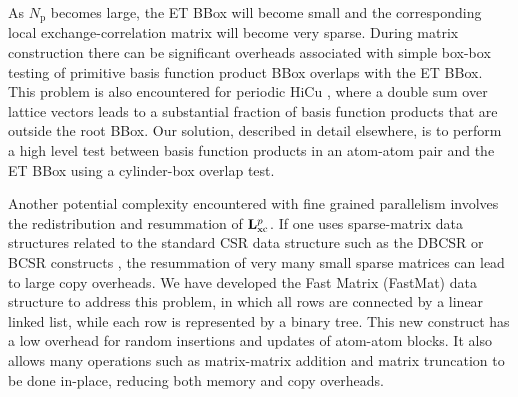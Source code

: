 \commentoutA{\documentclass[prl,aps,twocolumn,showpacs,twocolumngrid,superbib]{revtex4}}
\newcommand{\Np}{N_{\mathrm{p}}} \newcommand{\Nbox}{N_{\mathrm{b}}}
\begin{document}

As $\Np$ becomes large, the ET BBox will become small and the
corresponding local exchange-correlation matrix will become very
sparse.  During matrix construction there can be significant overheads
associated with simple box-box testing of primitive basis function
product BBox overlaps with the ET BBox.  This problem is also
encountered for periodic HiCu \cite{CTymczak03}, where a double sum
over lattice vectors leads to a substantial fraction of basis function
products that are outside the root BBox.  Our solution, described in
detail elsewhere\cite{MChallacombe03A}, is to perform a high level test between
basis function products in an atom-atom pair and the ET BBox using a
cylinder-box overlap test.


Another potential complexity encountered with fine grained parallelism
involves the redistribution and resummation of ${\bf
L}_{\mathrm{xc}}^{p}$.  If one uses sparse-matrix data structures
related to the standard CSR \cite{FGustavson78,SPissanetzky84} data
structure such as the DBCSR or BCSR constructs \cite{MChallacombe00B},
the resummation of very many small sparse matrices can lead to large
copy overheads.  We have developed the Fast Matrix \cite{MChallacombe03B} 
(FastMat) data structure to address this problem, in which all rows are 
connected by a linear linked list, while each row is represented by a binary tree.
This new construct has a low overhead for random insertions and
updates of atom-atom blocks.  It also allows many operations such as
matrix-matrix addition and matrix truncation to be done in-place,
reducing both memory and copy overheads.
\end{document}
